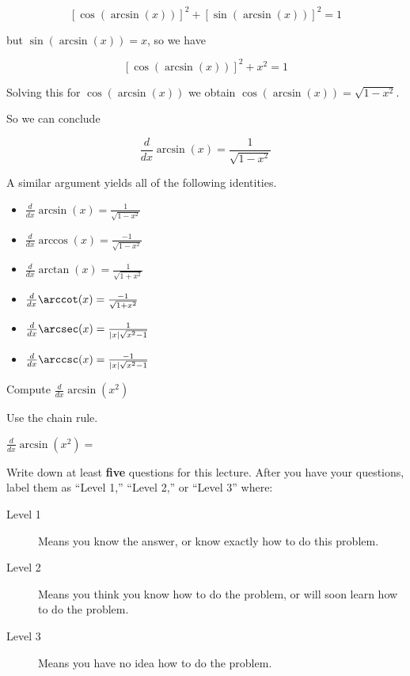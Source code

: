 \documentclass{ximera}
\begin{document}
\[
\left[\cos(\arcsin(x))\right]^2+\left[\sin(\arcsin(x))\right]^2=1
\] 

but $\sin(\arcsin(x)) = x$, so we have

\[
\left[\cos(\arcsin(x))\right]^2+x^2=1
\]

Solving this for $\cos(\arcsin(x))$ we obtain $\cos(\arcsin(x))=\sqrt{1-x^2}$.

So we can conclude

\[
\frac{d}{dx} \arcsin(x) = \frac{1}{\sqrt{1-x^2}}
\]

A similar argument yields all of the following identities.

\begin{itemize}
\item $\frac{d}{dx} \arcsin(x) = \frac{1}{\sqrt{1-x^2}}$
\item $\frac{d}{dx} \arccos(x) = \frac{-1}{\sqrt{1-x^2}}$
\item $\frac{d}{dx} \arctan(x) = \frac{1}{\sqrt{1+x^2}}$
\item $\frac{d}{dx} \arccot(x) = \frac{-1}{\sqrt{1+x^2}}$
\item $\frac{d}{dx} \arcsec(x) = \frac{1}{|x|\sqrt{x^2-1}}$
\item $\frac{d}{dx} \arccsc(x) = \frac{-1}{|x|\sqrt{x^2-1}}$
\end{itemize}

\begin{question}
	Compute $\frac{d}{dx} \arcsin(x^2)$
		\begin{hint}
			Use the chain rule.
		\end{hint}
		$\frac{d}{dx} \arcsin(x^2)=$
\end{question}

\begin{question}
Write down at least \textbf{five} questions for this lecture. After
you have your questions, label them as ``Level 1,'' ``Level 2,'' or ``Level 3'' where:
\begin{description}
\item[Level 1] Means you know the answer, or know exactly how to do this problem.
\item[Level 2] Means you think you know how to do the problem, or will soon learn how to do the problem.
\item[Level 3] Means you have no idea how to do the problem. 
\end{description}
  \begin{freeResponse}
  \end{freeResponse}
\end{question}
\end{document}
